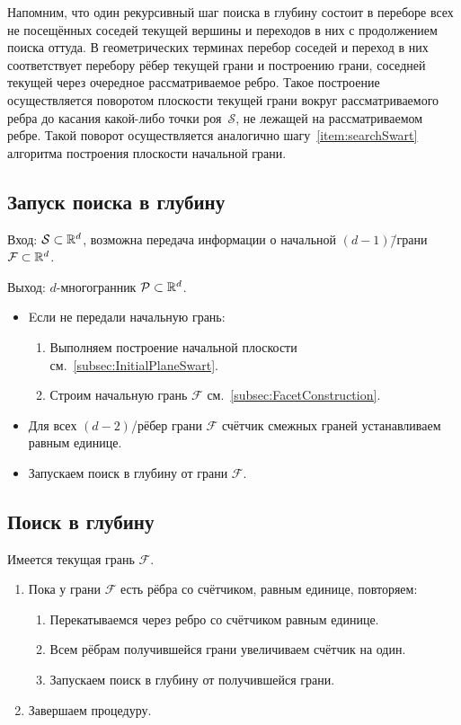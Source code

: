 \documentclass[a4paper,12pt]{article}
\newcommand{\R}[1][]{%
  \ifthenelse{\equal{#1}{}}%
  {\mathbb{R}}%
  {\mathbb{R}^{#1}}}
\newcommand{\Swarm}{\mathcal{S}}              %
\newcommand{\Polyhedron}{\mathcal{P}}         %
\newcommand{\Facet}{\mathcal{F}}              %
\renewcommand{\.}{\hspace{0.2ex}}
\begin{document}
  Напомним, что один рекурсивный шаг поиска в глубину состоит в переборе всех не посещённых соседей текущей вершины и переходов в них с продолжением поиска оттуда. В геометрических терминах перебор соседей и переход в них соответствует перебору рёбер текущей грани и построению грани, соседней текущей через очередное рассматриваемое ребро. Такое построение осуществляется поворотом плоскости текущей грани вокруг рассматриваемого ребра до касания какой-либо точки роя~$\Swarm$, не лежащей на рассматриваемом ребре. Такой поворот осуществляется аналогично шагу~\ref{item:searchSwart} алгоритма построения плоскости начальной грани.

  \subsection{Запуск поиска в глубину}

    Вход: $\Swarm \subset \R[d]$, возможна передача информации о начальной $(d-1)$\=/грани $\Facet \subset \R[d]$.

    Выход: $d$-многогранник $\Polyhedron \subset \R[d]$.

    \begin{itemize}
      \item Eсли не передали начальную грань:
      \begin{enumerate}
        \item Выполняем построение начальной плоскости см.~\ref{subsec:InitialPlaneSwart}.
        \item Строим начальную грань $\Facet$ см.~\ref{subsec:FacetConstruction}.
      \end{enumerate}
      \item Для всех $(d-2)$\-/рёбер грани $\Facet$ счётчик смежных граней устанавливаем равным единице.
      \item Запускаем поиск в глубину от грани $\Facet$.
    \end{itemize}




  \subsection{Поиск в глубину}

    Имеется текущая грань $\Facet$.
    \begin{enumerate}
      \item Пока у грани $\Facet$ есть рёбра со счётчиком, равным единице, повторяем:
      \begin{enumerate}
        \item Перекатываемся через ребро со счётчиком равным единице.
        \item Всем рёбрам получившейся грани увеличиваем счётчик на один.
        \item Запускаем поиск в глубину от получившейся грани.
      \end{enumerate}
      \item Завершаем процедуру.
    \end{enumerate}
\end{document}
